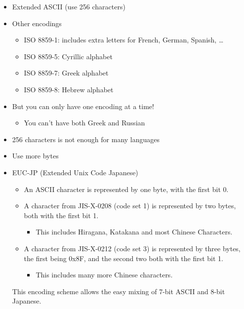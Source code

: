 \documentclass[a4paper,landscape,headrule,footrule,xetex]{foils}
\begin{document}

\begin{itemize}
\item Extended ASCII (use 256 characters)
\item Other encodings
  \begin{itemize}
  \item ISO 8859-1: includes extra letters for French, German, Spanish, \ldots
  \item ISO 8859-5: Cyrillic alphabet
  \item ISO 8859-7: Greek alphabet
  \item ISO 8859-8: Hebrew alphabet 
  \end{itemize}
\item But you can only have one encoding at a time!
  \begin{itemize}
  \item  You can't have both Greek and Russian
  \end{itemize}
\item 256 characters is not enough for many languages
\end{itemize}



\begin{itemize}
\item Use more bytes
\item EUC-JP (Extended Unix Code Japanese)
  \begin{itemize}
  \item An ASCII character is represented by one byte, with the first bit 0.
  \item A character from JIS-X-0208 (code set 1) is represented by two
    bytes, both with the first bit 1.
    \begin{itemize}
    \item  This includes Hiragana, Katakana and most Chinese Characters.
    \end{itemize}
  \item A character from JIS-X-0212 (code set 3) is represented by
    three bytes, the first being 0x8F, and the second two both with the first bit 1.
    \begin{itemize}
    \item  This includes many more Chinese characters.
    \end{itemize}
  \end{itemize}
 This encoding scheme allows the easy mixing of 7-bit ASCII and 8-bit Japanese.
\end{itemize}
\end{document}
